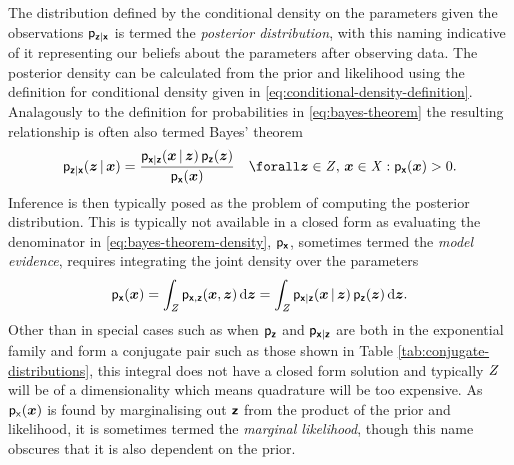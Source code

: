 The distribution defined by the conditional density on the parameters given the observations $\mathsf{p}_{\boldsymbol{\mathsf{z}}|\boldsymbol{\mathsf{x}}}$ is termed the \emph{posterior distribution}, with this naming indicative of it representing our beliefs about the parameters after observing data. The posterior density can be calculated from the prior and likelihood using the definition for conditional density given in \eqref{eq:conditional-density-definition}. Analagously to the definition for probabilities in \eqref{eq:bayes-theorem} the resulting relationship is often also termed Bayes' theorem
\begin{equation}\label{eq:bayes-theorem-density}
 \pden{\rvct{z}|\rvct{x}}(\vct{z}\gvn\vct{x}) =
 \frac{\pden{\rvct{x}|\rvct{z}}(\vct{x}\gvn\vct{z})\,\pden{\rvct{z}}(\vct{z})}{\pden{\rvct{x}}(\vct{x})}
 \quad \forall \vct{z} \in \set{Z},\,\vct{x} \in \set{X} : \pden{\rvct{x}}(\vct{x}) > 0.
\end{equation}
Inference is then typically posed as the problem of computing the posterior distribution. This is typically not available in a closed form as evaluating the denominator in \eqref{eq:bayes-theorem-density}, $\mathsf{p}_{\boldsymbol{\mathsf{x}}}$, sometimes termed the \emph{model evidence}, requires integrating the joint density over the parameters
\begin{equation}\label{eq:model-evidence-integral}
 \mathsf{p}_{\boldsymbol{\mathsf{x}}}(\boldsymbol{x}) = 
 \int_{\mathit{Z}} \mathsf{p}_{\boldsymbol{\mathsf{x}},\boldsymbol{\mathsf{z}}}(\boldsymbol{x},\boldsymbol{z})\,\mathrm{d}\boldsymbol{z} =
 \int_{\mathit{Z}} \mathsf{p}_{\boldsymbol{\mathsf{x}}|\boldsymbol{\mathsf{z}}}(\boldsymbol{x}\operatorname{|}\boldsymbol{z})\,\mathsf{p}_{\boldsymbol{\mathsf{z}}}(\boldsymbol{z})
 \,\mathrm{d}\boldsymbol{z}.
\end{equation}
Other than in special cases such as when $\mathsf{p}_{\boldsymbol{\mathsf{z}}}$ and $\mathsf{p}_{\boldsymbol{\mathsf{x}}|\boldsymbol{\mathsf{z}}}$ are both in the exponential family and form a conjugate pair such as those shown in Table \ref{tab:conjugate-distributions}, this integral does not have a closed form solution and typically $\mathit{Z}$ will be of a dimensionality which means quadrature will be too expensive. As $\mathsf{p}_{\mathsf{x}}(\boldsymbol{x})$ is found by marginalising out $\boldsymbol{\mathsf{z}}$ from the product of the prior and likelihood, it is sometimes termed the \emph{marginal likelihood}, though this name obscures that it is also dependent on the prior.

